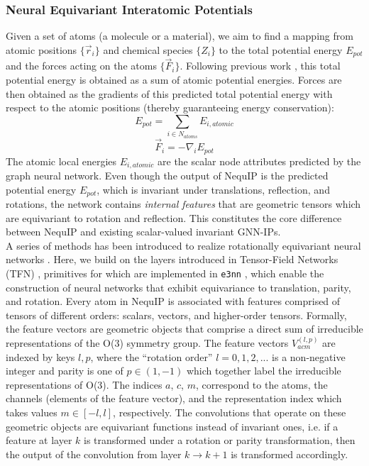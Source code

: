 \documentclass[%
reprint,
superscriptaddress,
nofootinbib,
amsmath,amssymb,
aps,
prl,
]{revtex4-1}
\begin{document}
\subsubsection{Neural Equivariant Interatomic Potentials}
Given a set of atoms (a molecule or a material), we aim to find a mapping from atomic positions $\{\vec{r}_i\}$ and chemical species $\{Z_i\}$ to the total potential energy $E_{pot}$ and the forces acting on the atoms $\{\vec{F}_i\}$. Following previous work \cite{behler2007generalized}, this total potential energy is obtained as a sum of atomic potential energies. Forces are then obtained as the gradients of this predicted total potential energy with respect to the atomic positions (thereby guaranteeing energy conservation): 
\begin{equation}
    E_{pot} = \sum_{i \in N_{atoms}} E_{i, atomic}
\label{pot_e_sum}
\end{equation}
%
\begin{equation}
    \vec{F}_i = - \nabla_i E_{pot}
\label{eq:forces_gradient}
\end{equation}
The atomic local energies $E_{i, atomic}$ are the scalar node attributes predicted by the graph neural network. Even though the output of NequIP is the predicted potential energy $E_{pot}$, which is invariant under translations, reflection, and rotations, the network contains \textit{internal features} that are geometric tensors which are equivariant to rotation and reflection. This constitutes the core difference between NequIP and existing scalar-valued invariant GNN-IPs.\\

A series of methods has been introduced to realize rotationally equivariant neural networks \cite{thomas2018tensor, weiler20183d, kondor2018n,  kondor2018clebsch, gnnff}. Here, we build on the layers introduced in Tensor-Field Networks (TFN) \cite{thomas2018tensor}, primitives for which are implemented in \texttt{e3nn} \cite{mario_geiger_2021_4735637}, which enable the construction of neural networks that exhibit equivariance to translation, parity, and rotation. Every atom in NequIP is associated with features comprised of tensors of different orders: scalars, vectors, and higher-order tensors. Formally, the feature vectors are geometric objects that comprise a direct sum of irreducible representations of the O(3) symmetry group. The feature vectors $V_{acm}^{(l,p)}$ are indexed by keys $l,p$, where the ``rotation order'' $l=0, 1,2,...$ is a non-negative integer and parity is one of $p \in (1, -1)$ which together label the irreducible representations of O(3). The indices $a$, $c$, $m$, correspond to the atoms, the channels (elements of the feature vector), and the representation index which takes values $m \in [-l, l]$, respectively. The convolutions that operate on these geometric objects are equivariant functions instead of invariant ones, i.e. if a feature at layer $k$ is transformed under a rotation or parity transformation, then the output of the convolution from layer $k \rightarrow k+1$ is transformed accordingly. 
\\
\end{document}
